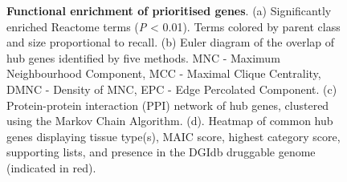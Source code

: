\documentclass[
  11,
  a4paper,
]{article}
\begin{document}
\begin{figure}


\caption{\label{fig-fig2}\textbf{Functional enrichment of prioritised
genes}. (a) Significantly enriched Reactome terms (\emph{P} \textless{}
0.01). Terms colored by parent class and size proportional to recall.
(b) Euler diagram of the overlap of hub genes identified by five
methods. MNC - Maximum Neighbourhood Component, MCC - Maximal Clique
Centrality, DMNC - Density of MNC, EPC - Edge Percolated Component. (c)
Protein-protein interaction (PPI) network of hub genes, clustered using
the Markov Chain Algorithm. (d). Heatmap of common hub genes displaying
tissue type(s), MAIC score, highest category score, supporting lists,
and presence in the DGIdb druggable genome (indicated in red).}

\end{figure}%
\end{document}
